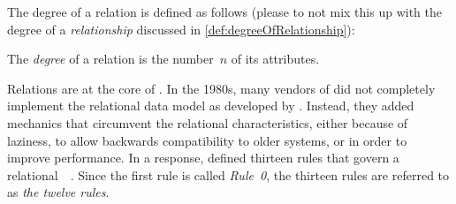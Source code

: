 The degree of a relation is defined as follows (please to not mix this up with the degree of a \emph{relationship} discussed in \cref{def:degreeOfRelationship}):%
%
\begin{definition}%
The \emph{degree} of a relation is the number~$n$ of its attributes.%
\end{definition}%
%
Relations are at the core of .%
%
%
In the 1980s, many vendors of  did not completely implement the relational data model as developed by \citeauthor{C1985IYDRR}.
Instead, they added mechanics that circumvent the relational characteristics, either because of laziness, to allow backwards compatibility to older systems, or in order to improve performance.
In a response, \citeauthor{C1985IYDRR} defined thirteen rules that govern a relational~~\cite{C1985IYDRR,C1986AESFDBMSTACTBR,S2024D:LDMRMRA,SP2002STYSI2D,SPMP1998SI2TDDASVEI12T}.
Since the first rule is called \emph{Rule~0}, the thirteen rules are referred to as \emph{the twelve rules}.%
%
